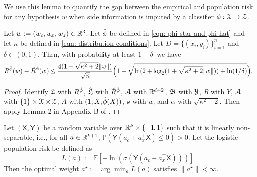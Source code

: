 We use this lemma to quantify the gap between the empirical and population risk for any hypothesis $w$ when side information is imputed by a classifier $\phi : \mathcal{X} \to \mathcal{Z}$.

\begin{lem}\label{lem: empirical and population risk gap}
    Let $w := (w_c, w_x, w_z) \in \mathbb{R}^3$. Let $\hat{\phi}$ be defined in \eqref{eqn: phi star and phi hat} and let $\kappa$ be defined in \eqref{eqn: distribution conditions}. Let $D= \{(x_i, y_i)\}_{i=1}^n$ and $\delta \in (0,1)$. Then, with probability at least $1-\delta$, we have
    \begin{equation*}
    \begin{aligned}
        R^{\hat{\phi}}(w) - \hat{R}^{\hat{\phi}}(w) \leq
        \frac{4(1+\sqrt{\kappa^2+2}\|w\|)}{\sqrt{n}}\Big(1+\sqrt{\ln(2+\log_2(1+\sqrt{\kappa^2+2}\|w\|)) +
        \ln(1/\delta)}\Big).
    \end{aligned}
    \end{equation*}
\end{lem}

\begin{proof}
    Identify $\mathfrak{L}$ with $R^{\hat{\phi}}$, $\hat{\mathfrak{L}}$ with $\hat{R}^{\hat{\phi}}$, $\mathcal{A}$ with $\mathbb{R}^{d+2}$, $\mathfrak{B}$ with $\mathcal{Y}$, $B$ with $Y$, $\mathcal{A}$ with $\{1\} \times \mathcal{X} \times \mathcal{Z}$, $A$ with $(1,X,\hat{\phi}(X))$, $\mathtt{w}$ with $w$, and $\alpha$ with $\sqrt{\kappa^2 + 2}$. Then apply Lemma 2 in Appendix B of \cite{della2021regularized}.
\end{proof}

 

\begin{lem}\label{lem: finite norm for optimal weights}
    Let $(\mathsf{X}, \mathsf{Y})$ be a random variable over $\mathbb{R}^k \times \{-1,1\}$ such that it is linearly non-separable, i.e., for all $a \in \mathbb{R}^{k+1}$, $\mathbb{P}(\mathsf{Y}(a_c + a_x^\top \mathsf{X}) \le 0) > 0$. Let the logistic population risk be defined as
    \begin{equation*}
        L(a) := \mathbb{E}[-\ln(\sigma(\mathsf{Y}(a_c + a_x^\top \mathsf{X})))].
    \end{equation*}
    Then the optimal weight $a^\star := \arg\min_a L(a)$ satisfies $\|a^\star\| < \infty$.
\end{lem}

